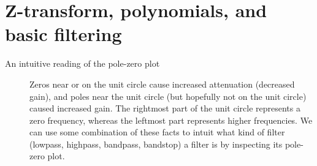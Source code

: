 \documentclass{article}
\begin{document}
\section{Z-transform, polynomials, and basic filtering}
\begin{description}
\item[An intuitive reading of the pole-zero plot] Zeros near or on the unit circle cause increased attenuation (decreased gain), and poles near the unit circle (but hopefully not on the unit circle) caused increased gain. The rightmost part of the unit circle represents a zero frequency, whereas the leftmost part represents higher frequencies. We can use some combination of these facts to intuit what kind of filter (lowpass, highpass, bandpass, bandstop) a filter is by inspecting its pole-zero plot.
\end{description}
\end{document}
